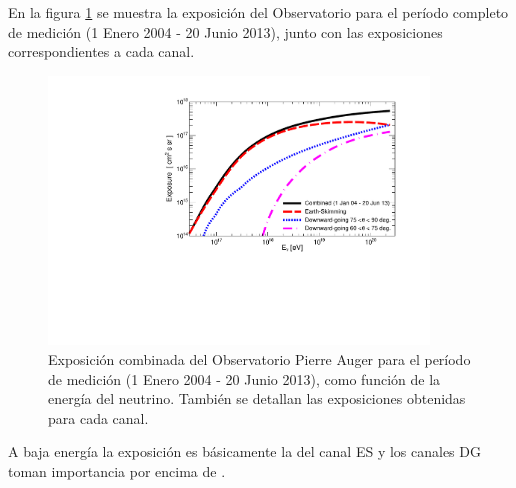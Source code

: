 	En la figura \ref{fig:expTot} se muestra la exposición del Observatorio para el período completo de medición (1 Enero 2004 - 20 Junio 2013), junto con las exposiciones correspondientes a cada canal. 
	\begin{figure}[ht!]
		\begin{center}
			\includegraphics[width=0.9\textwidth]{fig/resultadosAuger/exposure_combined_ageing}
			\caption{\label{fig:expTot}Exposición combinada del Observatorio Pierre Auger para el período de medición (1 Enero 2004 - 20 Junio 2013), como función de la energía del neutrino. También se detallan las exposiciones obtenidas para cada canal.}
			
		\end{center}
	\end{figure}
	A baja energía la exposición es básicamente la del canal ES y los canales DG toman importancia por encima de .
	
